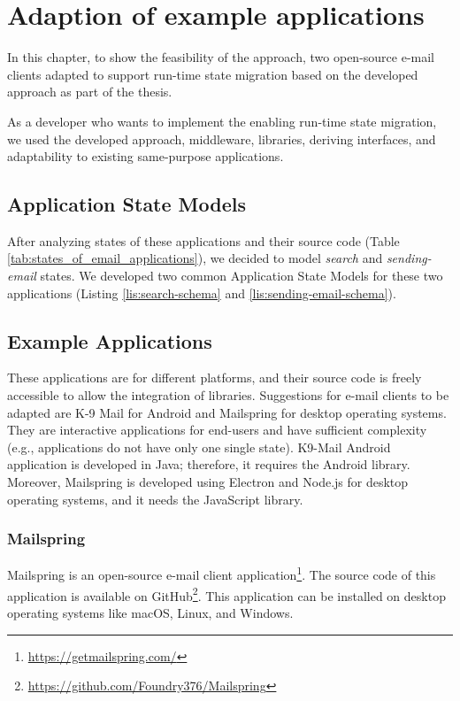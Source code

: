 \chapter{Adaption of example applications}
\label{ch:adaption}
In this chapter, to show the feasibility of the approach, two open-source e-mail clients adapted to support run-time state migration based on the developed approach as part of the thesis.

As a developer who wants to implement the enabling run-time state migration, we used the developed approach, middleware, libraries, deriving interfaces, and adaptability to existing same-purpose applications. 

\section{Application State Models}
After analyzing states of these applications and their source code (Table \ref{tab:states_of_email_applications}), we decided to model \textit{search} and \textit{sending-email} states. We developed two common Application State Models for these two applications (Listing \ref{lis:search-schema} and \ref{lis:sending-email-schema}). 



\section{Example Applications}
These applications are for different platforms, and their source code is freely accessible to allow the integration of libraries. 
Suggestions for e-mail clients to be adapted are K-9 Mail for Android and Mailspring for desktop operating systems. They are interactive applications for end-users and have sufficient complexity (e.g., applications do not have only one single state).
K9-Mail Android application is developed in Java; therefore, it requires the Android library. Moreover, Mailspring is developed using Electron and Node.js for desktop operating systems, and it needs the JavaScript library.

\subsection{Mailspring}
Mailspring is an open-source e-mail client application\footnote{\url{https://getmailspring.com/}}. The source code of this application is available on GitHub\footnote{\url{https://github.com/Foundry376/Mailspring}}. This application can be installed on desktop operating systems like macOS, Linux, and Windows.
